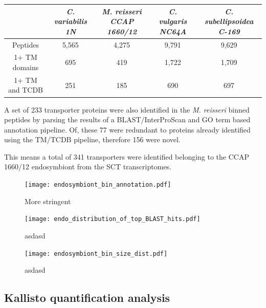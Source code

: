 \begin{table}
    \begin{tabular}{|c|c|c|c|c|}
        \hline
        & \textit{C. variabilis 1N} & \textit{M. reisseri CCAP 1660/12} & \textit{C. vulgaris NC64A} & \textit{C. subellipsoidea C-169} \\
        \hline
        Peptides        & 5,565 & 4,275 & 9,791 & 9,629 \\
        1+ TM domains   & 695 & 419 & 1,722 & 1,709 \\
        1+ TM and TCDB  & 251 & 185 & 690 & 697 \\
        \hline
    \end{tabular}
\end{table}






A set of 233 
transporter proteins were also identified 
in the \textit{M. reisseri} binned peptides
by parsing the results of a 
BLAST/InterProScan and GO term based annotation pipeline.
Of, these 77 were redundant to proteins already identified using
the TM/TCDB pipeline, therefore 156 were novel.

This means a total of 341 transporters were identified 
belonging to the CCAP 1660/12 endosymbiont from the SCT transcriptomes. 







\begin{figure}
    \texttt{[image: endosymbiont\_bin\_annotation.pdf]}
    \caption{More stringent} 
\end{figure}



\begin{figure}
    \texttt{[image: endo\_distribution\_of\_top\_BLAST\_hits.pdf]}
    \caption[Endostymbiont Bin Top BLAST Hits]{asdasd}
\end{figure}


\begin{figure}
    \texttt{[image: endosymbiont\_bin\_size\_dist.pdf]}
    \caption{asdasd}
\end{figure}






\subsection{Kallisto quantification analysis}

